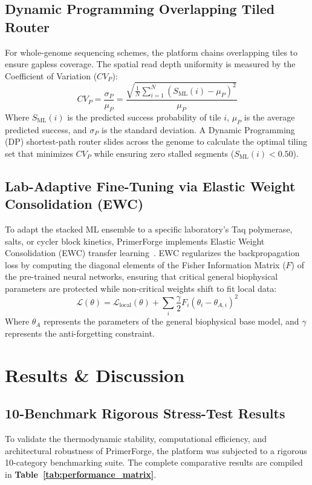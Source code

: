 \documentclass[twocolumn,10pt]{article}
\begin{document}
\subsection{Dynamic Programming Overlapping Tiled Router}
For whole-genome sequencing schemes, the platform chains overlapping tiles to ensure gapless coverage. The spatial read depth uniformity is measured by the Coefficient of Variation ($CV_P$):
\begin{equation}
CV_P = \frac{\sigma_P}{\mu_P} = \frac{\sqrt{\frac{1}{N}\sum_{i=1}^N (S_{\text{ML}}(i) - \mu_P)^2}}{\mu_P}
\end{equation}
Where $S_{\text{ML}}(i)$ is the predicted success probability of tile $i$, $\mu_P$ is the average predicted success, and $\sigma_P$ is the standard deviation. A Dynamic Programming (DP) shortest-path router slides across the genome to calculate the optimal tiling set that minimizes $CV_P$ while ensuring zero stalled segments ($S_{\text{ML}}(i) < 0.50$).

\subsection{Lab-Adaptive Fine-Tuning via Elastic Weight Consolidation (EWC)}
To adapt the stacked ML ensemble to a specific laboratory’s Taq polymerase, salts, or cycler block kinetics, PrimerForge implements Elastic Weight Consolidation (EWC) transfer learning~\cite{kirkpatrick2017}. EWC regularizes the backpropagation loss by computing the diagonal elements of the Fisher Information Matrix ($F$) of the pre-trained neural networks, ensuring that critical general biophysical parameters are protected while non-critical weights shift to fit local data:
\begin{equation}
\mathcal{L}(\theta) = \mathcal{L}_{\text{local}}(\theta) + \sum_i \frac{\gamma}{2} F_i (\theta_i - \theta_{A,i})^2
\end{equation}
Where $\theta_A$ represents the parameters of the general biophysical base model, and $\gamma$ represents the anti-forgetting constraint.

\section{Results \& Discussion}

\subsection{10-Benchmark Rigorous Stress-Test Results}
To validate the thermodynamic stability, computational efficiency, and architectural robustness of PrimerForge, the platform was subjected to a rigorous 10-category benchmarking suite. The complete comparative results are compiled in \textbf{Table~\ref{tab:performance_matrix}}.
\end{document}
